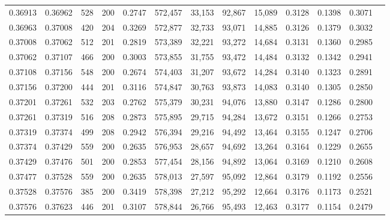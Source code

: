 \begin{tabular}{rrrrrrrrrrrrr}
0.36913 & 0.36962 &   528 & 200 &                                     0.2747 & 572,457 &  33,153 &  92,867 &  15,089 & 0.3128 & 0.1398 & 0.3071 \\
0.36963 & 0.37008 &   420 & 204 &                                     0.3269 & 572,877 &  32,733 &  93,071 &  14,885 & 0.3126 & 0.1379 & 0.3032 \\
0.37008 & 0.37062 &   512 & 201 &                                     0.2819 & 573,389 &  32,221 &  93,272 &  14,684 & 0.3131 & 0.1360 & 0.2985 \\
0.37062 & 0.37107 &   466 & 200 &                                     0.3003 & 573,855 &  31,755 &  93,472 &  14,484 & 0.3132 & 0.1342 & 0.2941 \\
0.37108 & 0.37156 &   548 & 200 &                                     0.2674 & 574,403 &  31,207 &  93,672 &  14,284 & 0.3140 & 0.1323 & 0.2891 \\
0.37156 & 0.37200 &   444 & 201 &                                     0.3116 & 574,847 &  30,763 &  93,873 &  14,083 & 0.3140 & 0.1305 & 0.2850 \\
0.37201 & 0.37261 &   532 & 203 &                                     0.2762 & 575,379 &  30,231 &  94,076 &  13,880 & 0.3147 & 0.1286 & 0.2800 \\
0.37261 & 0.37319 &   516 & 208 &                                     0.2873 & 575,895 &  29,715 &  94,284 &  13,672 & 0.3151 & 0.1266 & 0.2753 \\
0.37319 & 0.37374 &   499 & 208 &                                     0.2942 & 576,394 &  29,216 &  94,492 &  13,464 & 0.3155 & 0.1247 & 0.2706 \\
0.37374 & 0.37429 &   559 & 200 &                                     0.2635 & 576,953 &  28,657 &  94,692 &  13,264 & 0.3164 & 0.1229 & 0.2655 \\
0.37429 & 0.37476 &   501 & 200 &                                     0.2853 & 577,454 &  28,156 &  94,892 &  13,064 & 0.3169 & 0.1210 & 0.2608 \\
0.37477 & 0.37528 &   559 & 200 &                                     0.2635 & 578,013 &  27,597 &  95,092 &  12,864 & 0.3179 & 0.1192 & 0.2556 \\
0.37528 & 0.37576 &   385 & 200 &                                     0.3419 & 578,398 &  27,212 &  95,292 &  12,664 & 0.3176 & 0.1173 & 0.2521 \\
0.37576 & 0.37623 &   446 & 201 &                                     0.3107 & 578,844 &  26,766 &  95,493 &  12,463 & 0.3177 & 0.1154 & 0.2479 \\

\end{tabular}
